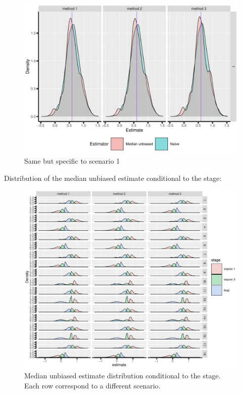 \documentclass[12pt]{article}
\begin{document}
\begin{figure}[!h]
\centering
\includegraphics[trim={0 0 0 0},width=\textwidth]{./figures/gg3stage-estimate-density-scenario1.pdf}
\caption{Same but specific to scenario 1}
\end{figure}

\clearpage

Distribution of the median unbiased estimate conditional to the stage:
\begin{figure}[!h]
\centering
\includegraphics[trim={0 0 0 0},width=1\textwidth]{./figures/gg3stage-estimateC-density.pdf}
\caption{Median unbiased estimate distribution conditional to the stage. Each row correspond to a different scenario.}
\end{figure}
\end{document}
